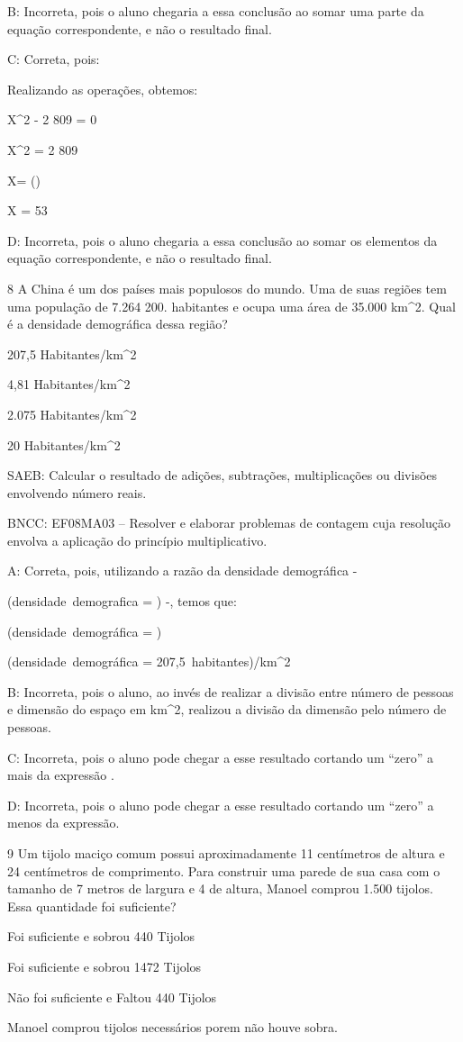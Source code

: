 {B: Incorreta, pois o aluno chegaria a essa conclusão ao somar uma parte
da equação correspondente, e não o resultado final.

C: Correta, pois:

Realizando as operações, obtemos:

X^2 - 2 809 = 0

X^2 = 2 809

X= ()

X = 53

D: Incorreta, pois o aluno chegaria a essa conclusão ao somar os
elementos da equação correspondente, e não o resultado final.

\num{8} A China é um dos países mais populosos do mundo. Uma de suas regiões
tem uma população de 7.264 200. habitantes e ocupa uma área de 35.000
km^2. Qual é a densidade demográfica dessa região?
\item 207,5 Habitantes/km^2
\item 4,81 Habitantes/km^2
\item 2.075 Habitantes/km^2
\item 20 Habitantes/km^2

SAEB: Calcular o resultado de adições, subtrações, multiplicações ou
divisões envolvendo número reais.

BNCC: EF08MA03 -- Resolver e elaborar problemas de contagem cuja
resolução envolva a aplicação do princípio multiplicativo.

A: Correta, pois, utilizando a razão da densidade demográfica -

(densidade\ demografica = )
-, temos que:

(densidade\ demográfica = )

(densidade\ demográfica = 207,5\ habitantes)/km^2

B: Incorreta, pois o aluno, ao invés de realizar a divisão entre número
de pessoas e dimensão do espaço em km^2, realizou a divisão da dimensão
pelo número de pessoas.

C: Incorreta, pois o aluno pode chegar a esse resultado cortando um
``zero'' a mais da expressão .

D: Incorreta, pois o aluno pode chegar a esse resultado cortando um
``zero'' a menos da expressão.

\num{9} Um tijolo maciço comum possui aproximadamente 11 centímetros de
altura e 24 centímetros de comprimento. Para construir uma parede de sua
casa com o tamanho de 7 metros de largura e 4 de altura, Manoel comprou
1.500 tijolos. Essa quantidade foi suficiente?
\item Foi suficiente e sobrou 440 Tijolos
\item Foi suficiente e sobrou 1472 Tijolos
\item Não foi suficiente e Faltou 440 Tijolos
\item Manoel comprou tijolos necessários porem não houve sobra.

}
